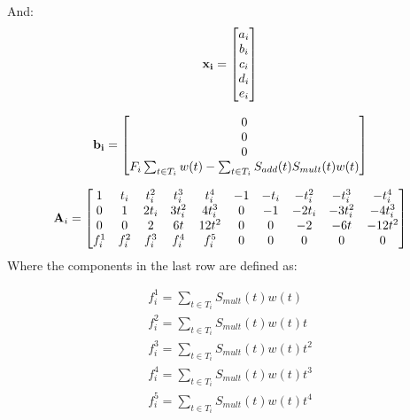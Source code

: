 \documentclass{article}
\begin{document}
And:
\begin{equation*}
    \mathbf{x_i} = \begin{bmatrix}
        a_i \\
        b_i \\
        c_i \\
        d_i \\
        e_i \\
    \end{bmatrix}
\end{equation*}

\begin{equation*}
    \mathbf{b_i} = \begin{bmatrix}
        0 \\
        0 \\
        0 \\
        F_i \sum_{t \in T_i} w(t) - 
        \sum_{t \in T_i} S_{add}(t)S_{mult}(t)w(t)
    \end{bmatrix}
\end{equation*}

\begin{equation*}
    \mathbf{A}_i = \begin{bmatrix}
        1 & t_i & t_i^2 & t_i^3 & t_i^4 & -1 & -t_i & -t_i^2 & -t_i^3 & -t_i^4 \\
        0 & 1 & 2 t_i & 3 t_i^2 & 4 t_i^3 & 0 & -1 & -2 t_i & -3 t_i^2 & -4 t_i^3 \\
        0 & 0 & 2 & 6 t & 12 t^2 & 0 & 0 & -2 & -6 t & -12 t^2 \\
        f_i^1 & f_i^2 & f_i^3 & f_i^4 & f_i^5 & 0 & 0 & 0 & 0 & 0
    \end{bmatrix}
\end{equation*}
Where the components in the last row are defined as:

\begin{eqnarray}
    \nonumber
    f_i^1 = \sum_{t \in T_i} S_{mult}(t)w(t) \\
    \nonumber
    f_i^2 = \sum_{t \in T_i} S_{mult}(t)w(t) t \\
    \nonumber
    f_i^3 = \sum_{t \in T_i} S_{mult}(t)w(t) t^2 \\
    \nonumber
    f_i^4 = \sum_{t \in T_i} S_{mult}(t)w(t) t^3 \\
    \nonumber
    f_i^5 = \sum_{t \in T_i} S_{mult}(t)w(t) t^4  
\end{eqnarray}
\end{document}

